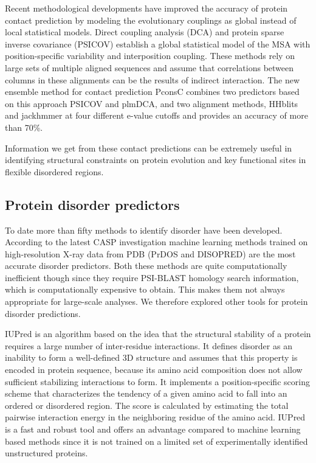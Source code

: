 \documentclass[11pt, a4paper,oneside]{report}
\begin{document}
 Recent methodological developments have improved the accuracy of protein contact prediction by modeling the evolutionary couplings as global instead of local statistical models.  Direct coupling analysis (DCA)\cite{Morcos2011} and protein sparse inverse covariance (PSICOV)\cite{Jones2012} establish a global statistical model of the MSA with position-specific variability and interposition coupling. These methods rely on large sets of multiple aligned sequences and assume that correlations between columns in these alignments can be the results of indirect interaction. The new ensemble method for contact prediction PconsC\cite{Skwark2013} combines two predictors based on this approach PSICOV and plmDCA\cite{Ekeberg2013}, and two alignment methods, HHblits and jackhmmer at four different e-value cutoffs and provides an accuracy of more than 70\%. 
 
Information we get from these contact predictions can be extremely useful in identifying structural constraints on protein evolution and key functional sites in flexible disordered regions.

\subsection{Protein disorder predictors}
To date more than fifty methods to identify disorder have been developed\cite{He2009}.  
According to the latest CASP investigation machine learning methods trained on high-resolution X-ray data from PDB (PrDOS and DISOPRED) are the most accurate disorder predictors\cite{Monastyrskyy2011}. Both these methods are quite computationally inefficient though since they require PSI-BLAST homology search information, which is computationally expensive to obtain\cite{Ward2004}. This makes them not always appropriate for large-scale analyses.  We therefore explored other tools for protein disorder predictions. 

  IUPred\cite{Dosztanyi2005} is an algorithm based on the idea that the structural stability of a protein requires a large number of inter-residue interactions. It defines disorder as an inability to form a well-defined 3D structure and assumes that this property is encoded in protein sequence, because its amino acid composition does not allow sufficient stabilizing interactions to form. 
It implements a position-specific scoring scheme that characterizes the tendency of a given amino acid to fall into an ordered or disordered region. The score is calculated by estimating the total pairwise interaction energy in the neighboring residue of the amino acid. IUPred is a fast and robust tool and offers an advantage compared to machine learning based methods since it is not trained on a limited set of experimentally identified unstructured proteins.  
\end{document}
